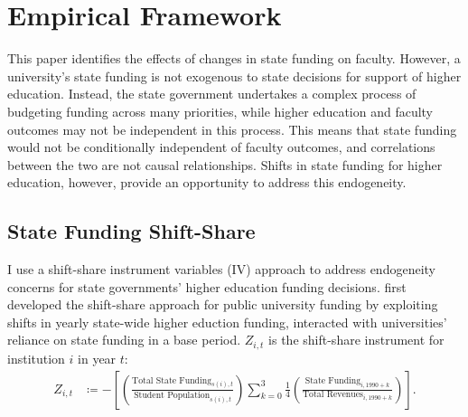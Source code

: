\section{Empirical Framework}
\label{sec:empirics}

This paper identifies the effects of changes in state funding on faculty.
However, a university's state funding is not exogenous to state decisions for support of higher education.
Instead, the state government undertakes a complex process of budgeting funding across many priorities, while higher education and faculty outcomes may not be independent in this process.
This means that state funding would not be conditionally independent of faculty outcomes, and correlations between the two are not causal relationships.
Shifts in state funding for higher education, however, provide an opportunity to address this endogeneity.

\subsection{State Funding Shift-Share}
\label{sec:approp-shocks}
I use a shift-share instrument variables (IV) approach to address endogeneity concerns for state governments' higher education funding decisions.
\cite{NBERw23736,NBERw27885} first developed the shift-share approach for public university funding by exploiting shifts in yearly state-wide higher eduction funding, interacted with universities' reliance on state funding in a base period.
$Z_{i,t}$ is the shift-share instrument for institution $i$ in year $t$:
\begin{align}
    \label{eqn:public-instrument}
    Z_{i,t} &\coloneqq - \left[
    \left( \frac{\text{Total State Funding}_{s(i),t}}{\text{Student Population}_{s(i),t}} \right)
    \sum_{k = 0}^{3} \frac 14
    \left( \frac{\text{State Funding}_{i,1990 + k}}{\text{Total Revenues}_{i,1990 + k}} \right) \right].
\end{align}

